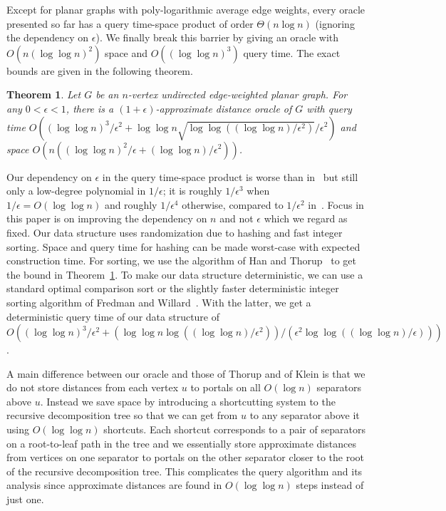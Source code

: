 \documentclass[11pt]{article}
\newtheorem{theorem}{Theorem}
\begin{document}
Except for planar graphs with poly-logarithmic average edge weights, every oracle presented so far has a query time-space product of order $\Theta(n\log n)$ (ignoring the dependency on $\epsilon$). We finally break this barrier by giving an oracle with $O(n(\log\log n)^2)$ space and $O((\log\log n)^3)$ query time. The exact bounds are given in the following theorem.
\begin{theorem}\label{Thm:Main}
Let $G$ be an $n$-vertex undirected edge-weighted planar graph. For any $0 < \epsilon < 1$, there is a $(1+\epsilon)$-approximate distance oracle of $G$ with query time $O((\log\log n)^3/\epsilon^2 + \log\log n\sqrt{\log\log((\log\log n)/\epsilon^2)}/\epsilon^2)$ and space $O(n((\log\log n)^2/\epsilon + (\log\log n)/\epsilon^2))$.
\end{theorem}
Our dependency on $\epsilon$ in the query time-space product is worse than in~\cite{OraclePlanarKlein, OraclePlanarThorup} but still only a low-degree polynomial in $1/\epsilon$; it is roughly $1/\epsilon^3$ when $1/\epsilon = O(\log\log n)$ and roughly $1/\epsilon^4$ otherwise, compared to $1/\epsilon^2$ in~\cite{OraclePlanarKlein, OraclePlanarThorup}. Focus in this paper is on improving the dependency on $n$ and not $\epsilon$ which we regard as fixed. Our data structure uses randomization due to hashing and fast integer sorting. Space and query time for hashing can be made worst-case with expected construction time. For sorting, we use the algorithm of Han and Thorup~\cite{IntegerSorting} to get the bound in Theorem~\ref{Thm:Main}. To make our data structure deterministic, we can use a standard optimal comparison sort or the slightly faster deterministic integer sorting algorithm of Fredman and Willard~\cite{DetIntSorting}. With the latter, we get a deterministic query time of our data structure of $O((\log\log n)^3/\epsilon^2 + (\log\log n\log((\log\log n)/\epsilon^2))/(\epsilon^2\log\log((\log\log n)/\epsilon)))$.

A main difference between our oracle and those of Thorup and of Klein is that we do not store distances from each vertex $u$ to portals on all $O(\log n)$ separators above $u$. Instead we save space by introducing a shortcutting system to the recursive decomposition tree so that we can get from $u$ to any separator above it using $O(\log\log n)$ shortcuts. Each shortcut corresponds to a pair of separators on a root-to-leaf path in the tree and we essentially store approximate distances from vertices on one separator to portals on the other separator closer to the root of the recursive decomposition tree. This complicates the query algorithm and its analysis since approximate distances are found in $O(\log\log n)$ steps instead of just one.
\end{document}
